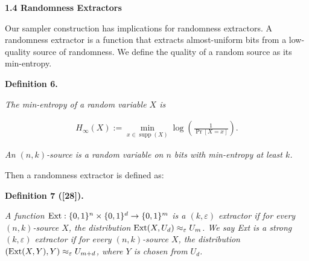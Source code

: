 \documentclass[10pt,a4paper]{article}
\begin{document}
\par\medskip\noindent\textbf{
1.4 Randomness Extractors}\par




Our sampler construction has implications for randomness extractors.
A randomness extractor is a function that extracts almost-uniform bits from a low-quality source of randomness. We define the quality of a random source as its min-entropy.\par





\par\medskip\noindent\textbf{
\textbf{Definition 6}\textbf{.}
}\par



\emph{The min-entropy of a random variable $X$ is}\par


\[\begin{gathered}
H_{\infty}(X):=\min_{x\in\operatorname*{supp}(X)}\log\left(\frac{1}{\Pr[X=x]}\right).
\end{gathered}\]




\emph{An $(n,k)$-source is a random variable on $n$ bits with min-entropy at least $k$.}\par






Then a randomness extractor is defined as:\par





\par\medskip\noindent\textbf{
\textbf{Definition 7}\textbf{ }([28])\textbf{.}
}\par



\emph{A function $\textup{{Ext}}:\{0,1\}^{n}\times\{0,1\}^{d}\rightarrow\{0,1\}^{m}$ is a $(k,\varepsilon)$ extractor if for every $(n,k)$-source $X$, the distribution $\textup{{Ext}}(X,U_{d})\approx_{\varepsilon}U_{m}$. We say Ext is a strong $(k,\varepsilon)$ extractor if for every $(n,k)$-source $X$, the distribution $(\textup{{Ext}}(X,Y),Y)\approx_{\varepsilon}U_{m+d}$, where $Y$ is chosen from $U_{d}$.}\par
\end{document}
